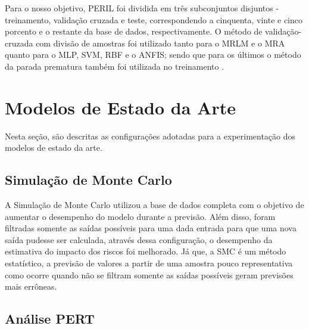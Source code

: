 Para o nosso objetivo, PERIL foi dividida em três subconjuntos disjuntos - treinamento, validação cruzada e teste, correspondendo a cinquenta, vinte e cinco porcento e o restante da base de dados, respectivamente. O método de validação-cruzada com divisão de amostras foi utilizado tanto para o MRLM e o MRA quanto para o MLP, SVM, RBF e o ANFIS; sendo que para os últimos o método da parada prematura também foi utilizada no treinamento \cite{priddy2005artificial}.

\section{Modelos de Estado da Arte}
\label{sec:models}

Nesta seção, são descritas as configurações adotadas para a experimentação dos modelos de estado da arte.

\subsection{Simulação de Monte Carlo}

A Simulação de Monte Carlo utilizou a base de dados completa com o objetivo de aumentar o desempenho do modelo durante a previsão. Além disso, foram filtradas somente as saídas possíveis para uma dada entrada para que uma nova saída pudesse ser calculada, através dessa configuração, o desempenho da estimativa do impacto dos riscos foi melhorado. Já que, a SMC é um método estatístico, a previsão de valores a partir de uma amostra pouco representativa como ocorre quando não se filtram somente as saídas possíveis geram previsões mais errôneas.

\subsection{Análise PERT}

